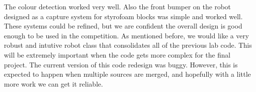 \documentclass[twocolumn]{article}
\begin{document}
The colour detection worked very well. Also the front bumper on the robot designed as a capture system for styrofoam blocks was simple and worked well. These systems could be refined, but we are confident the overall design is good enough to be used in the competition. As mentioned before, we would like a very robust and intutive robot class that consolidates all of the previous lab code. This will be extremely important when the code gets more complex for the final project. The current version of this code redesign was buggy. However, this is expected to happen when multiple sources are merged, and hopefully with a little more work we can get it reliable.


\end{document}
